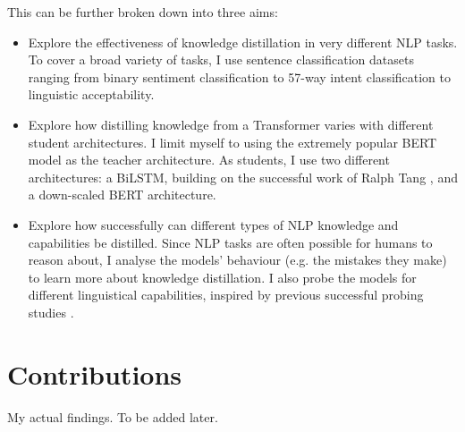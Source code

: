 \documentclass[bsc,frontabs,singlespacing,parskip,deptreport]{infthesis}
\begin{document}
{{    This can be further broken down into three aims:
    \begin{itemize}
      \item Explore the effectiveness of knowledge distillation in very different NLP tasks. To cover a broad variety of tasks, I use sentence classification datasets ranging from binary sentiment classification to 57-way intent classification to linguistic acceptability.
      \item Explore how distilling knowledge from a Transformer varies with different student architectures. I limit myself to using the extremely popular BERT model \citep{Devlin_2018} as the teacher architecture. As students, I use two different architectures: a BiLSTM, building on the successful work of Ralph Tang \citep{Tang_2019a,Tang_2019b}, and a down-scaled BERT architecture.
      \item Explore how successfully can different types of NLP knowledge and capabilities be distilled. Since NLP tasks are often possible for humans to reason about, I analyse the models' behaviour (e.g. the mistakes they make) to learn more about knowledge distillation. I also probe the models for different linguistical capabilities, inspired by previous successful probing studies \citep{Conneau_2018,Tenney_2019b}.
    \end{itemize}
  }
  
  \section{Contributions}{
    My actual findings. To be added later.
  }
}
\end{document}
